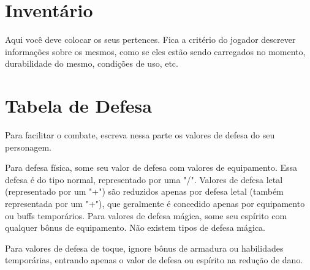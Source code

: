 \section{Inventário} 

Aqui você deve colocar os seus pertences. Fica a critério do jogador descrever informações sobre os mesmos, como se eles estão sendo carregados no momento, durabilidade do mesmo, condições de uso, etc.

\section{Tabela de Defesa}

Para facilitar o combate, escreva nessa parte os valores de defesa do seu personagem.

Para defesa física, some seu valor de defesa com valores de equipamento. Essa defesa é do tipo normal, representado por uma "/". Valores de defesa letal (representado por um "+") são reduzidos apenas por defesa letal (também representada por um "+"), que geralmente é concedido apenas por equipamento ou buffs temporários.
Para valores de defesa mágica, some seu espírito com qualquer bônus de equipamento. Não existem tipos de defesa mágica.

Para valores de defesa de toque, ignore bônus de armadura ou habilidades temporárias, entrando apenas o valor de defesa ou espírito na redução de dano.






